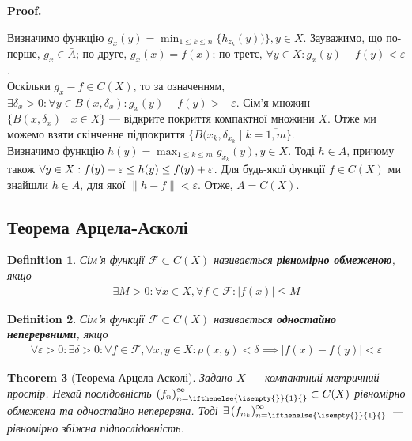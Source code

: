 \documentclass[a4paper, 10pt]{article}
\makeatletter
\theoremstyle{theoremdd}
\newtheorem{theorem}{Theorem}[subsection]
\theoremstyle{theoremdd}
\newtheorem{definition}[theorem]{Definition}
\theoremstyle{theoremdd}
\theoremstyle{theoremdd}
\theoremstyle{theoremdd}
\theoremstyle{theoremdd}
\theoremstyle{theoremdd}
\theoremstyle{theoremdd}
\newcommand{\sequence}[2][]{\left({#2}\right)_{n=\ifthenelse{\isempty{#1}}{1}{#1}}^{\infty}}
\renewenvironment{proof}[1][Proof.\\]{\par
\pushQED{\hfill \qed}%
\normalfont \topsep6\p@\@plus6\p@\relax
\trivlist
\item\relax
{\bfseries
#1\@addpunct{.}}\hspace\labelsep\ignorespaces
}{%
\popQED\endtrivlist\@endpefalse
}
\makeatother
\begin{document}
\begin{proof}
Визначимо функцію $g_x(y) = \displaystyle\min_{1 \leq k \leq n} \{h_{z_k}(y))\}, y \in X$. Зауважимо, що по-перше, $g_x \in \bar{A}$; по-друге, $g_x(x) = f(x)$; по-третє, $\forall y \in X: g_x(y) -f(y) < \varepsilon$.\\
Оскільки $g_x - f \in C(X)$, то за означенням, $\exists \delta_x > 0: \forall y \in B(x,\delta_x): g_x(y) - f(y) > - \varepsilon$. Сім'я множин $\{B(x,\delta_x) \mid x \in X \}$ --- відкрите покриття компактної множини $X$. Отже ми можемо взяти скінченне підпокриття $\{B(x_k,\delta_{x_k} \mid k = \overline{1,m}\}$.\\
Визначимо функцію $h(y) = \displaystyle\max_{1 \leq k \leq m} g_{x_k}(y), y \in X$. Тоді $h \in \bar{A}$, причому також $\forall y \in X: \\ f(y) - \varepsilon \leq h(y) \leq f(y) + \varepsilon$. Для будь-якої функції $f \in C(X)$ ми знайшли $h \in A$, для якої $\|h - f\| < \varepsilon$. Отже, $\bar{A} = C(X)$.
\end{proof}

\subsection{Теорема Арцела-Асколі}
\begin{definition}
Сім'я функції $\mathcal{F} \subset C(X)$ називається \textbf{рівномірно обмеженою}, якщо
\begin{align*}
\exists M > 0: \forall x \in X, \forall f \in \mathcal{F}: |f(x)| \leq M
\end{align*}
\end{definition}

\begin{definition}
Сім'я функції $\mathcal{F} \subset C(X)$ називається \textbf{одностайно неперервними}, якщо
\begin{align*}
\forall \varepsilon > 0: \exists \delta > 0: \forall f \in \mathcal{F}, \forall x,y \in X: \rho(x,y) < \delta \implies |f(x) - f(y)| < \varepsilon
\end{align*}
\end{definition}

\begin{theorem}[Теорема Арцела-Асколі]
Задано $X$ --- компактний метричний простір. Нехай послідовність $\sequence{f_n} \subset C(X)$ рівномірно обмежена та одностайно неперервна. Тоді $\exists \sequence{f_{n_k}}$ --- рівномірно збіжна підпослідовність.
\end{theorem}
\end{document}
